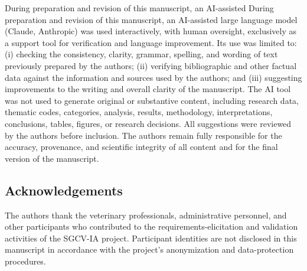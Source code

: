 \documentclass[12pt]{article}
\begin{document}
During preparation and revision of this manuscript, an AI-assisted
During preparation and revision of this manuscript, an AI-assisted
large language model (Claude, Anthropic) was used interactively,
with human oversight, exclusively as a support tool for verification
and language improvement. Its use was limited to: (i) checking the
consistency, clarity, grammar, spelling, and wording of text previously
prepared by the authors; (ii) verifying bibliographic and other factual
data against the information and sources used by the authors; and
(iii) suggesting improvements to the writing and overall clarity of
the manuscript. The AI tool was not used to generate original or
substantive content, including research data, thematic codes,
categories, analysis, results, methodology, interpretations,
conclusions, tables, figures, or research decisions. All suggestions
were reviewed by the authors before inclusion. The authors remain
fully responsible for the accuracy, provenance, and scientific
integrity of all content and for the final version of the manuscript.


\subsection*{Acknowledgements}

The authors thank the veterinary professionals, administrative
personnel, and other participants who contributed to the
requirements-elicitation and validation activities of the SGCV-IA
project. Participant identities are not disclosed in this manuscript
in accordance with the project's anonymization and data-protection
procedures.
\end{document}
